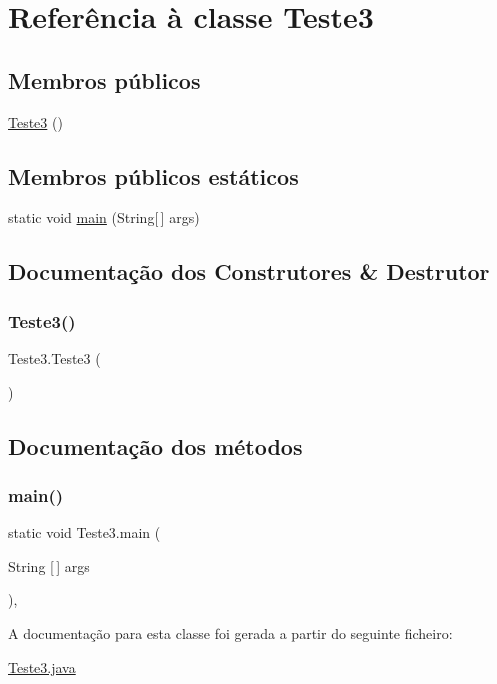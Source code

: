 \hypertarget{class_teste3}{}\section{Referência à classe Teste3}
\label{class_teste3}
\subsection*{Membros públicos}
\begin{DoxyCompactItemize}
\item 
\hyperlink{class_teste3_a1c44a6eb451eafc9b70fa99dd6eeaa7f}{Teste3} ()
\end{DoxyCompactItemize}
\subsection*{Membros públicos estáticos}
\begin{DoxyCompactItemize}
\item 
static void \hyperlink{class_teste3_ad2a899906513bec887d2bf16bbb80a96}{main} (String\mbox{[}$\,$\mbox{]} args)
\end{DoxyCompactItemize}


\subsection{Documentação dos Construtores \& Destrutor}
\hypertarget{class_teste3_a1c44a6eb451eafc9b70fa99dd6eeaa7f}{}\label{class_teste3_a1c44a6eb451eafc9b70fa99dd6eeaa7f} 
\subsubsection{\texorpdfstring{Teste3()}{Teste3()}}
{\footnotesize\ttfamily Teste3.\+Teste3 (\begin{DoxyParamCaption}{ }\end{DoxyParamCaption})\hspace{0.3cm}{\ttfamily [inline]}}



\subsection{Documentação dos métodos}
\hypertarget{class_teste3_ad2a899906513bec887d2bf16bbb80a96}{}\label{class_teste3_ad2a899906513bec887d2bf16bbb80a96} 
\subsubsection{\texorpdfstring{main()}{main()}}
{\footnotesize\ttfamily static void Teste3.\+main (\begin{DoxyParamCaption}\item[{String \mbox{[}$\,$\mbox{]}}]{args }\end{DoxyParamCaption})\hspace{0.3cm}{\ttfamily [inline]}, {\ttfamily [static]}}



A documentação para esta classe foi gerada a partir do seguinte ficheiro\+:\begin{DoxyCompactItemize}
\item 
\hyperlink{_teste3_8java}{Teste3.\+java}\end{DoxyCompactItemize}
